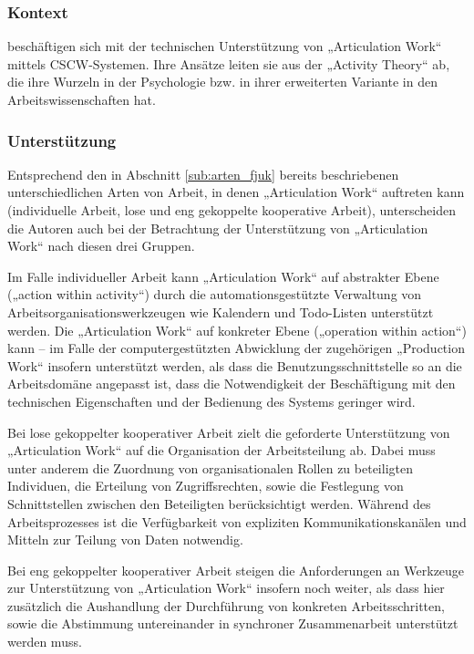 \subsubsection{Kontext}

\citet{Fjuk97} beschäftigen sich mit der technischen Unterstützung von „Articulation Work“ mittels \gls{CSCW}-Systemen. Ihre Ansätze leiten sie aus der „Activity Theory“ ab, die ihre Wurzeln in der Psychologie \citep{Leontev72} bzw. in ihrer erweiterten Variante in den Arbeitswissenschaften \citep{Engestrom00} hat.
 
\subsubsection{Unterstützung}

Entsprechend den in Abschnitt \ref{sub:arten_fjuk} bereits beschriebenen unterschiedlichen Arten von Arbeit, in denen „Articulation Work“ auftreten kann (individuelle Arbeit, lose und eng gekoppelte kooperative Arbeit), unterscheiden die Autoren auch bei der Betrachtung der Unterstützung von „Articulation Work“ nach diesen drei Gruppen.

Im Falle individueller Arbeit kann „Articulation Work“ auf abstrakter Ebene („action within activity“) durch die automationsgestützte Verwaltung von Arbeitsorganisationswerkzeugen wie Kalendern und Todo-Listen unterstützt werden. Die „Articulation Work“ auf konkreter Ebene („operation within action“) kann -- im Falle der computergestützten Abwicklung der zugehörigen „Production Work“ insofern unterstützt werden, als dass die Benutzungsschnittstelle so an die Arbeitsdomäne angepasst ist, dass die Notwendigkeit der Beschäftigung mit den technischen Eigenschaften und der Bedienung des Systems geringer wird.

Bei lose gekoppelter kooperativer Arbeit zielt die geforderte Unterstützung von „Articulation Work“ auf die Organisation der Arbeitsteilung ab. Dabei muss unter anderem die Zuordnung von organisationalen Rollen zu beteiligten Individuen, die Erteilung von Zugriffsrechten, sowie die Festlegung von Schnittstellen zwischen den Beteiligten berücksichtigt werden. Während des Arbeitsprozesses ist die Verfügbarkeit von expliziten Kommunikationskanälen und Mitteln zur Teilung von Daten notwendig.

Bei eng gekoppelter kooperativer Arbeit steigen die Anforderungen an Werkzeuge zur Unterstützung von „Articulation Work“ insofern noch weiter, als dass hier zusätzlich die Aushandlung der Durchführung von konkreten Arbeitsschritten, sowie die Abstimmung untereinander in synchroner Zusammenarbeit unterstützt werden muss.

